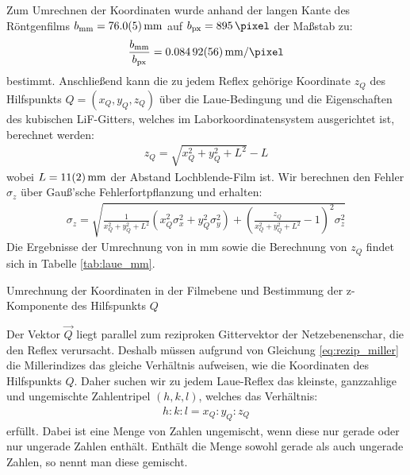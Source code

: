 \documentclass[11pt, a4paper]{article}
\begin{document}
Zum Umrechnen der Koordinaten wurde anhand der langen Kante des Röntgenfilms $b_\mathrm{mm} = \SI{76 +- 0.5}{\milli\metre}$ auf $b_\mathrm{px} = \SI{895}{\pixel}$ der Maßstab zu:
\begin{align}
  \frac{b_\mathrm{mm}}{b_\mathrm{px}} = \SI{0.08492 +- 0.00056}{\milli\metre\per\pixel}
\end{align}
bestimmt.
Anschließend kann die zu jedem Reflex gehörige Koordinate $z_Q$ des Hilfspunkts $Q = (x_Q, y_Q, z_Q)$ über die Laue-Bedingung und die Eigenschaften des kubischen LiF-Gitters, welches im Laborkoordinatensystem ausgerichtet ist, berechnet werden:
\begin{align}
  z_Q = \sqrt{x_Q^2 + y_Q^2 + L^2} - L
\end{align}
wobei $L = \SI{11 +- 2}{\milli\metre}$ der Abstand Lochblende-Film ist.
Wir berechnen den Fehler $\sigma_z$ über Gauß'sche Fehlerfortpflanzung und erhalten:
\begin{align}
  \sigma_z = \sqrt{ \frac{1}{x_Q^2 + y_Q^2 + L^2} \left( x_Q^2  \sigma_x^2 + y_Q^2 \sigma_y^2 \right) + \left( \frac{z_Q}{x_Q^2 + y_Q^2 + L^2}-1\right)^2 \sigma_z^2}
\end{align}
Die Ergebnisse der Umrechnung von \si{\pixel} in \si{\milli\metre} sowie die Berechnung von $z_Q$ findet sich in Tabelle \ref{tab:laue_mm}.
\begin{table}[h]
\centering

\caption{Umrechnung der Koordinaten in der Filmebene und Bestimmung der z-Komponente des Hilfspunkts $Q$}
\label{tab:laue_mm}
\end{table}

Der Vektor $\vec{Q}$ liegt parallel zum reziproken Gittervektor der Netzebenenschar, die den Reflex verursacht.
Deshalb müssen aufgrund von Gleichung \ref{eq:rezip_miller} die Millerindizes das gleiche Verhältnis aufweisen, wie die Koordinaten des Hilfspunkts $Q$.
Daher suchen wir zu jedem Laue-Reflex das kleinste, ganzzahlige und ungemischte Zahlentripel $(h,k,l)$, welches das Verhältnis:
\begin{align}
  h:k:l = x_Q : y_Q : z_Q
\end{align}
erfüllt.
Dabei ist eine Menge von Zahlen ungemischt, wenn diese nur gerade oder nur ungerade Zahlen enthält.
Enthält die Menge sowohl gerade als auch ungerade Zahlen, so nennt man diese gemischt.
\end{document}
